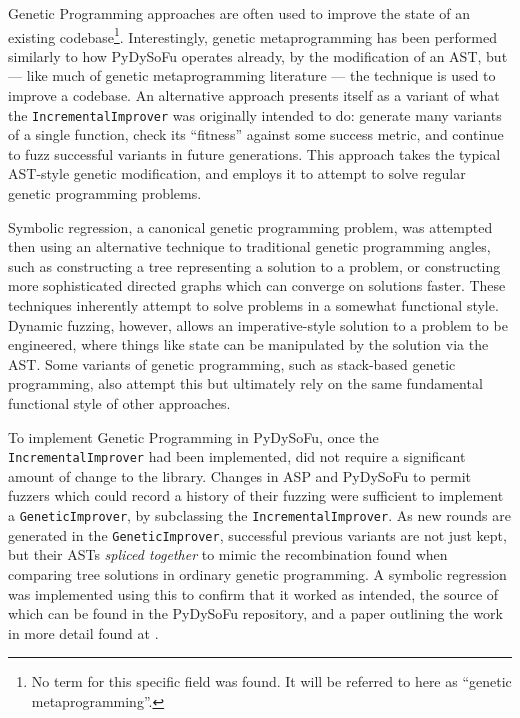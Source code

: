 \documentclass[draft]{article}
\begin{document}
Genetic Programming approaches are often used to improve the state of an
existing codebase\cite{genetic_metaprogramming}\footnote{No term for this
  specific field was found. It will be referred to here as ``genetic
  metaprogramming''.}. Interestingly, genetic metaprogramming has been performed
similarly to how PyDySoFu operates already, by the modification of an
AST\cite{locoGP}, but --- like much of genetic metaprogramming literature ---
the technique is used to improve a codebase. An alternative approach presents
itself as a variant of what the \texttt{IncrementalImprover} was originally
intended to do: generate many variants of a single function, check its
``fitness'' against some success metric, and continue to fuzz successful
variants in future generations. This approach takes the typical AST-style
genetic modification, and employs it to attempt to solve regular genetic
programming problems.\par

Symbolic regression, a canonical genetic programming problem, was attempted then
using an alternative technique to traditional genetic programming angles, such
as constructing a tree representing a solution to a
problem\cite{koza_or_maybe_langdon}, or constructing more sophisticated directed
graphs which can converge on solutions faster\cite{cartesian_gp}. These
techniques inherently attempt to solve problems in a somewhat functional style.
Dynamic fuzzing, however, allows an imperative-style solution to a problem to be
engineered, where things like state can be manipulated by the solution via the
AST. Some variants of genetic programming, such as stack-based genetic
programming, also attempt this\cite{stack_based_gp} but ultimately rely on the
same fundamental functional style of other approaches.\par

To implement Genetic Programming in PyDySoFu, once the
\texttt{IncrementalImprover} had been implemented, did not require a significant
amount of change to the library. Changes in ASP and PyDySoFu to permit fuzzers
which could record a history of their fuzzing were sufficient to implement
a \texttt{GeneticImprover}, by subclassing the \texttt{IncrementalImprover}. As
new rounds are generated in the \texttt{GeneticImprover}, successful previous
variants are not just kept, but their ASTs \emph{spliced together} to mimic the
recombination found when comparing tree solutions in ordinary
genetic programming\cite{gp_seminal}. A symbolic regression was implemented
using this to confirm that it worked as intended, the source of which can be
found in the PyDySoFu repository\cite{pydysofu_repo}, and a paper outlining the
work in more detail found at \cite{realx_paper}.
\end{document}
